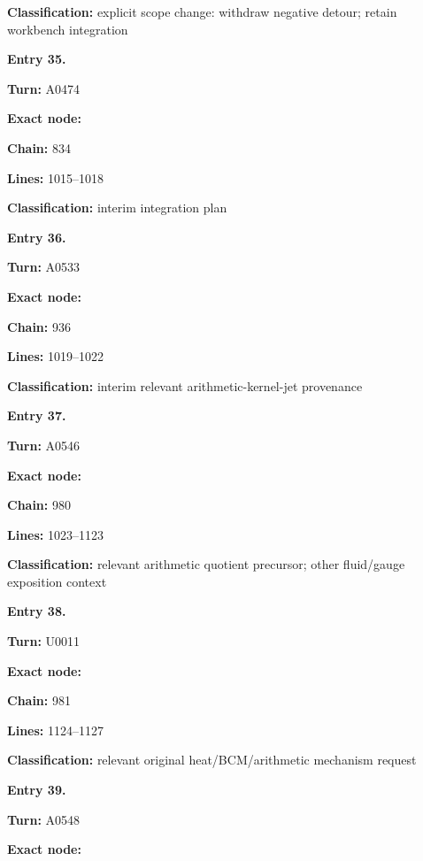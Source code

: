 \documentclass[10pt,a4paper,oneside]{report}
\begin{document}
\textbf{Classification:} explicit scope change: withdraw negative
detour; retain workbench integration


\textbf{Entry 35.}

\textbf{Turn:} A0474

\textbf{Exact node:} \protect{}

\textbf{Chain:} 834

\textbf{Lines:} 1015--1018

\textbf{Classification:} interim integration plan


\textbf{Entry 36.}

\textbf{Turn:} A0533

\textbf{Exact node:} \protect{}

\textbf{Chain:} 936

\textbf{Lines:} 1019--1022

\textbf{Classification:} interim relevant arithmetic-kernel-jet
provenance


\textbf{Entry 37.}

\textbf{Turn:} A0546

\textbf{Exact node:} \protect{}

\textbf{Chain:} 980

\textbf{Lines:} 1023--1123

\textbf{Classification:} relevant arithmetic quotient precursor; other
fluid/gauge exposition context


\textbf{Entry 38.}

\textbf{Turn:} U0011

\textbf{Exact node:} \protect{}

\textbf{Chain:} 981

\textbf{Lines:} 1124--1127

\textbf{Classification:} relevant original heat/BCM/arithmetic mechanism
request


\textbf{Entry 39.}

\textbf{Turn:} A0548

\textbf{Exact node:} \protect{}
\end{document}
